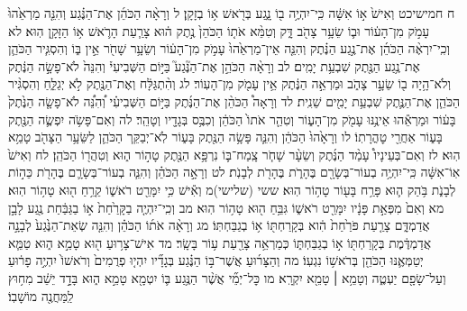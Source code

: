 \documentclass[twoside, openany, parskip=half, 11pt]{book}
\begin{document}
ח חמישיכט וְאִישׁ֙ א֣וֹ אִשָּׁ֔ה כִּֽי־יִהְיֶ֥ה ב֖וֹ נָ֑גַע בְּרֹ֖אשׁ א֥וֹ בְזָקָֽן׃ ל וְרָאָ֨ה הַכֹּהֵ֜ן אֶת־הַנֶּ֗גַע וְהִנֵּ֤ה מַרְאֵ֙הוּ֙ עָמֹ֣ק מִן־הָע֔וֹר וּב֛וֹ שֵׂעָ֥ר צָהֹ֖ב דָּ֑ק וְטִמֵּ֨א אֹת֤וֹ הַכֹּהֵן֙ נֶ֣תֶק ה֔וּא צָרַ֧עַת הָרֹ֛אשׁ א֥וֹ הַזָּקָ֖ן הֽוּא׃ לא וְכִֽי־יִרְאֶ֨ה הַכֹּהֵ֜ן אֶת־נֶ֣גַע הַנֶּ֗תֶק וְהִנֵּ֤ה אֵין־מַרְאֵ֙הוּ֙ עָמֹ֣ק מִן־הָע֔וֹר וְשֵׂעָ֥ר שָׁחֹ֖ר אֵ֣ין בּ֑וֹ וְהִסְגִּ֧יר הַכֹּהֵ֛ן אֶת־נֶ֥גַע הַנֶּ֖תֶק שִׁבְעַ֥ת יָמִֽים׃ לב וְרָאָ֨ה הַכֹּהֵ֣ן אֶת־הַנֶּ֘גַע֮ בַּיּ֣וֹם הַשְּׁבִיעִי֒ וְהִנֵּה֙ לֹא־פָשָׂ֣ה הַנֶּ֔תֶק וְלֹא־הָ֥יָה ב֖וֹ שֵׂעָ֣ר צָהֹ֑ב וּמַרְאֵ֣ה הַנֶּ֔תֶק אֵ֥ין עָמֹ֖ק מִן־הָעֽוֹר׃ לג וְהִ֨תְגַּלָּ֔ח וְאֶת־הַנֶּ֖תֶק לֹ֣א יְגַלֵּ֑חַ וְהִסְגִּ֨יר הַכֹּהֵ֧ן אֶת־הַנֶּ֛תֶק שִׁבְעַ֥ת יָמִ֖ים שֵׁנִֽית׃ לד וְרָאָה֩ הַכֹּהֵ֨ן אֶת־הַנֶּ֜תֶק בַּיּ֣וֹם הַשְּׁבִיעִ֗י וְ֠הִנֵּ֠ה לֹא־פָשָׂ֤ה הַנֶּ֙תֶק֙ בָּע֔וֹר וּמַרְאֵ֕הוּ אֵינֶ֥נּוּ עָמֹ֖ק מִן־הָע֑וֹר וְטִהַ֤ר אֹתוֹ֙ הַכֹּהֵ֔ן וְכִבֶּ֥ס בְּגָדָ֖יו וְטָהֵֽר׃ לה וְאִם־פָּשֹׂ֥ה יִפְשֶׂ֛ה הַנֶּ֖תֶק בָּע֑וֹר אַחֲרֵ֖י טׇהֳרָתֽוֹ׃ לו וְרָאָ֙הוּ֙ הַכֹּהֵ֔ן וְהִנֵּ֛ה פָּשָׂ֥ה הַנֶּ֖תֶק בָּע֑וֹר לֹֽא־יְבַקֵּ֧ר הַכֹּהֵ֛ן לַשֵּׂעָ֥ר הַצָּהֹ֖ב טָמֵ֥א הֽוּא׃ לז וְאִם־בְּעֵינָיו֩ עָמַ֨ד הַנֶּ֜תֶק וְשֵׂעָ֨ר שָׁחֹ֧ר צָֽמַח־בּ֛וֹ נִרְפָּ֥א הַנֶּ֖תֶק טָה֣וֹר ה֑וּא וְטִהֲר֖וֹ הַכֹּהֵֽן׃
לח וְאִישׁ֙ אֽוֹ־אִשָּׁ֔ה כִּֽי־יִהְיֶ֥ה בְעוֹר־בְּשָׂרָ֖ם בֶּהָרֹ֑ת בֶּהָרֹ֖ת לְבָנֹֽת׃ לט וְרָאָ֣ה הַכֹּהֵ֗ן וְהִנֵּ֧ה בְעוֹר־בְּשָׂרָ֛ם בֶּהָרֹ֖ת כֵּה֣וֹת לְבָנֹ֑ת בֹּ֥הַק ה֛וּא פָּרַ֥ח בָּע֖וֹר טָה֥וֹר הֽוּא׃
ששי (שלישי)מ וְאִ֕ישׁ כִּ֥י יִמָּרֵ֖ט רֹאשׁ֑וֹ קֵרֵ֥חַ ה֖וּא טָה֥וֹר הֽוּא׃ מא וְאִם֙ מִפְּאַ֣ת פָּנָ֔יו יִמָּרֵ֖ט רֹאשׁ֑וֹ גִּבֵּ֥חַ ה֖וּא טָה֥וֹר הֽוּא׃ מב וְכִֽי־יִהְיֶ֤ה בַקָּרַ֙חַת֙ א֣וֹ בַגַּבַּ֔חַת נֶ֖גַע לָבָ֣ן אֲדַמְדָּ֑ם צָרַ֤עַת פֹּרַ֙חַת֙ הִ֔וא בְּקָרַחְתּ֖וֹ א֥וֹ בְגַבַּחְתּֽוֹ׃ מג וְרָאָ֨ה אֹת֜וֹ הַכֹּהֵ֗ן וְהִנֵּ֤ה שְׂאֵת־הַנֶּ֙גַע֙ לְבָנָ֣ה אֲדַמְדֶּ֔מֶת בְּקָרַחְתּ֖וֹ א֣וֹ בְגַבַּחְתּ֑וֹ כְּמַרְאֵ֥ה צָרַ֖עַת ע֥וֹר בָּשָֽׂר׃ מד אִישׁ־צָר֥וּעַ ה֖וּא טָמֵ֣א ה֑וּא טַמֵּ֧א יְטַמְּאֶ֛נּוּ הַכֹּהֵ֖ן בְּרֹאשׁ֥וֹ נִגְעֽוֹ׃ מה וְהַצָּר֜וּעַ אֲשֶׁר־בּ֣וֹ הַנֶּ֗גַע בְּגָדָ֞יו יִהְי֤וּ פְרֻמִים֙ וְרֹאשׁוֹ֙ יִהְיֶ֣ה פָר֔וּעַ וְעַל־שָׂפָ֖ם יַעְטֶ֑ה וְטָמֵ֥א ׀ טָמֵ֖א יִקְרָֽא׃ מו כׇּל־יְמֵ֞י אֲשֶׁ֨ר הַנֶּ֥גַע בּ֛וֹ יִטְמָ֖א טָמֵ֣א ה֑וּא בָּדָ֣ד יֵשֵׁ֔ב מִח֥וּץ לַֽמַּחֲנֶ֖ה מוֹשָׁבֽוֹ׃
\end{document}
